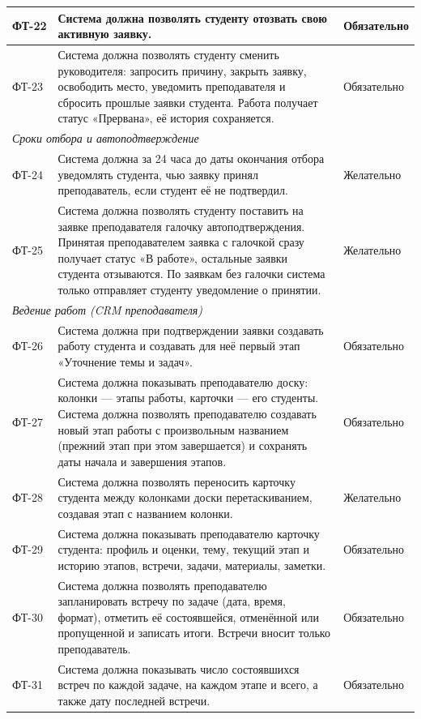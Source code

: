 \documentclass[a4paper,12pt]{article}
\begin{document}
{\begin{longtable}{|p{1.3cm}|p{11.1cm}|p{2.3cm}|}
ФТ-22 & Система должна позволять студенту отозвать свою активную заявку. & Обязательно\\ \hline
ФТ-23 & Система должна позволять студенту сменить руководителя: запросить причину, закрыть заявку, освободить место, уведомить преподавателя и сбросить прошлые заявки студента. Работа получает статус «Прервана», её история сохраняется. & Обязательно\\ \hline
\multicolumn{3}{|l|}{\textit{Сроки отбора и автоподтверждение}}\\ \hline
ФТ-24 & Система должна за 24 часа до даты окончания отбора уведомлять студента, чью заявку принял преподаватель, если студент её не подтвердил. & Желательно\\ \hline
ФТ-25 & Система должна позволять студенту поставить на заявке преподавателя галочку автоподтверждения. Принятая преподавателем заявка с галочкой сразу получает статус «В работе», остальные заявки студента отзываются. По заявкам без галочки система только отправляет студенту уведомление о принятии. & Желательно\\ \hline
\multicolumn{3}{|l|}{\textit{Ведение работ (CRM преподавателя)}}\\ \hline
ФТ-26 & Система должна при подтверждении заявки создавать работу студента и создавать для неё первый этап «Уточнение темы и задач». & Обязательно\\ \hline
ФТ-27 & Система должна показывать преподавателю доску: колонки — этапы работы, карточки — его студенты. Система должна позволять преподавателю создавать новый этап работы с произвольным названием (прежний этап при этом завершается) и сохранять даты начала и завершения этапов. & Обязательно\\ \hline
ФТ-28 & Система должна позволять переносить карточку студента между колонками доски перетаскиванием, создавая этап с названием колонки. & Желательно\\ \hline
ФТ-29 & Система должна показывать преподавателю карточку студента: профиль и оценки, тему, текущий этап и историю этапов, встречи, задачи, материалы, заметки. & Обязательно\\ \hline
ФТ-30 & Система должна позволять преподавателю запланировать встречу по задаче (дата, время, формат), отметить её состоявшейся, отменённой или пропущенной и записать итоги. Встречи вносит только преподаватель. & Обязательно\\ \hline
ФТ-31 & Система должна показывать число состоявшихся встреч по каждой задаче, на каждом этапе и всего, а также дату последней встречи. & Обязательно\\ \hline

\end{longtable}}
\end{document}
